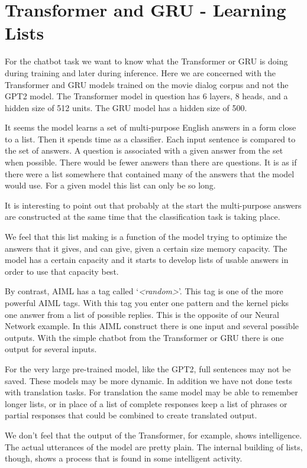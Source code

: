 \section{Transformer and GRU - Learning Lists}

For the chatbot task we want to know what the Transformer or GRU is doing during training and later during inference. Here we are concerned with the Transformer and GRU models trained on the movie dialog corpus and not the GPT2 model. The Transformer model in question has 6 layers, 8 heads, and a hidden size of 512 units. The GRU model has a hidden size of 500.

It seems the model learns a set of multi-purpose English answers in a form close to a list. Then it spends time as a classifier. Each input sentence is compared to the set of answers. A question is associated with a given answer from the set when possible. There would be fewer answers than there are questions. It is as if there were a list somewhere that contained many of the answers that the model would use. For a given model this list can only be so long.

It is interesting to point out that probably at the start the multi-purpose answers are constructed at the same time that the classification task is taking place. 

We feel that this list making is a function of the model trying to optimize the answers that it gives, and can give, given a certain size memory capacity. The model has a certain capacity and it starts to develop lists of usable answers in order to use that capacity best.

By contrast, AIML has a tag called `\textit{<random>}'. This tag is one of the more powerful AIML tags. With this tag you enter one pattern and the kernel picks one answer from a list of possible replies. This is the opposite of our Neural Network example. In this AIML construct there is one input and several possible outputs. With the simple chatbot from the Transformer or GRU there is one output for several inputs.

For the very large pre-trained model, like the GPT2, full sentences may not be saved. These models may be more dynamic. In addition we have not done tests with translation tasks. For translation the same model may be able to remember longer lists, or in place of a list of complete responses keep a list of phrases or partial responses that could be combined to create translated output.

We don't feel that the output of the Transformer, for example, shows intelligence. The actual utterances of the model are pretty plain. The internal building of lists, though, shows a process that is found in some intelligent activity.